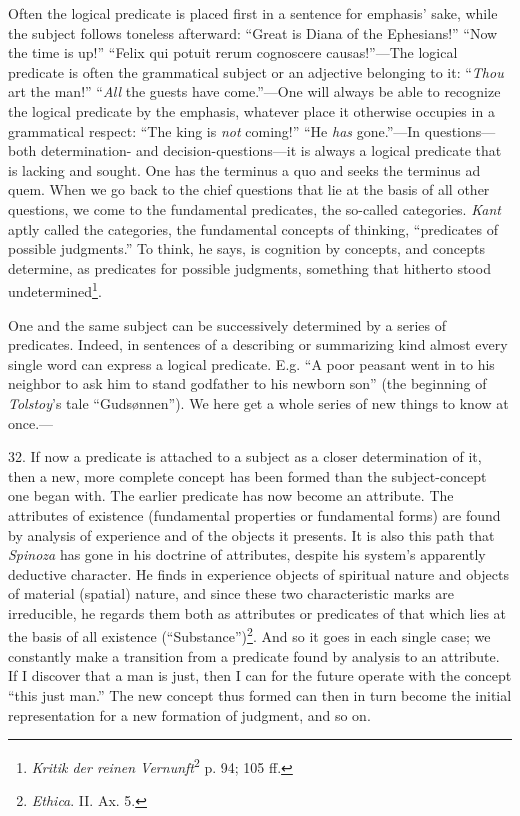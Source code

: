 \documentclass[12pt,a4paper]{book}
\newcommand{\opage}[1]{\marginnote{\footnotesize\textit{[#1]}}}
\begin{document}
Often the logical predicate is placed first in a sentence for emphasis'
sake, while the subject follows toneless afterward: ``Great is Diana of
the Ephesians!'' ``Now the time is up!'' ``Felix qui potuit rerum
cognoscere causas!''---The logical predicate is often the grammatical
subject or an adjective belonging to it: ``\emph{Thou} art the man!''
``\emph{All} the guests have come.''---One will always be able to
recognize the logical predicate by the emphasis, whatever place it
otherwise occupies in a grammatical respect: ``The king is \emph{not}
coming!'' ``He \emph{has} gone.''---In questions---both determination- and
decision-questions---it is always a logical predicate that is lacking and
sought. One has the terminus a quo and seeks the terminus ad quem. When we
go back to the chief questions that lie at the basis of all other
questions, we come to the fundamental predicates, the so-called
categories. \emph{Kant} aptly called the categories, the fundamental
concepts of thinking, ``predicates of possible judgments.'' To think, he
says, is cognition by concepts, and concepts determine, as predicates for
possible judgments, something that hitherto stood
undetermined\footnote{\emph{Kritik der reinen
Vernunft}\textsuperscript{2} p. 94; 105 ff.}.

One and the same subject can be successively determined by a series of
predicates. Indeed, in sentences of a describing or summarizing kind
almost every single word can express a logical predicate. E.g. ``A poor
peasant went in to his neighbor to ask him to stand godfather to his
newborn son'' (the beginning of \emph{Tolstoy}'s tale ``Gudsønnen''). We
here get a whole series of new things to know at once.---

32. If now a predicate is attached to a subject as a closer \opage{89}determination
of it, then a new, more complete concept has been formed than the
subject-concept one began with. The earlier predicate has now become an
attribute. The attributes of existence (fundamental properties or
fundamental forms) are found by analysis of experience and of the objects
it presents. It is also this path that \emph{Spinoza} has gone in his
doctrine of attributes, despite his system's apparently deductive
character. He finds in experience objects of spiritual nature and objects
of material (spatial) nature, and since these two characteristic marks are
irreducible, he regards them both as attributes or predicates of that
which lies at the basis of all existence
(``Substance'')\footnote{\emph{Ethica}. II. Ax. 5.}. And so it goes in
each single case; we constantly make a transition from a predicate found
by analysis to an attribute. If I discover that a man is just, then I can
for the future operate with the concept ``this just man.'' The new concept
thus formed can then in turn become the initial representation for a new
formation of judgment, and so on.
\end{document}
